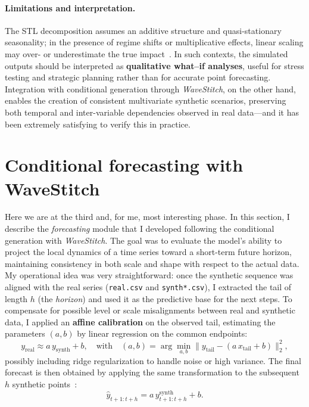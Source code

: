 \paragraph{Limitations and interpretation.}
The STL decomposition assumes an additive structure and quasi-stationary seasonality; in the presence of regime shifts or multiplicative effects, linear scaling may over- or underestimate the true impact~\cite{cleveland1990stl,shumway2017time}.  
In such contexts, the simulated outputs should be interpreted as \textbf{qualitative what--if analyses}, useful for stress testing and strategic planning rather than for accurate point forecasting.  
Integration with conditional generation through \emph{WaveStitch}, on the other hand, enables the creation of consistent multivariate synthetic scenarios, preserving both temporal and inter-variable dependencies observed in real data—and it has been extremely satisfying to verify this in practice.


\section{Conditional forecasting with WaveStitch}
\label{sec:forecasting-wavestitch}

Here we are at the third and, for me, most interesting phase. In this section, I describe the \emph{forecasting} module that I developed following the conditional generation with \emph{WaveStitch}.  
The goal was to evaluate the model’s ability to project the local dynamics of a time series toward a short-term future horizon, maintaining consistency in both scale and shape with respect to the actual data.  
My operational idea was very straightforward: once the synthetic sequence was aligned with the real series (\texttt{real.csv} and \texttt{synth*.csv}), I extracted the tail of length $h$ (the \emph{horizon}) and used it as the predictive base for the next steps.  
To compensate for possible level or scale misalignments between real and synthetic data, I applied an \textbf{affine calibration} on the observed tail, estimating the parameters $(a,b)$ by linear regression on the common endpoints:
\[
y_{\text{real}} \approx a\,y_{\text{synth}} + b,
\quad\text{with}\quad
(a,b) = \arg\min_{a,b} \| y_{\text{tail}} - (a\,x_{\text{tail}} + b) \|_2^2,
\]
possibly including ridge regularization to handle noise or high variance.  
The final forecast is then obtained by applying the same transformation to the subsequent $h$ synthetic points~\cite{bishop2006pattern,hastie2009elements}:
\[
\widehat{y}_{t+1:t+h} = a\,y^{\text{synth}}_{t+1:t+h} + b.
\]

